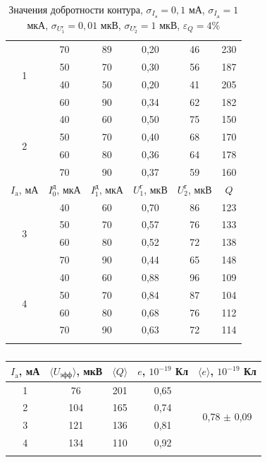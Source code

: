 \documentclass[a4paper, 12pt]{article}%
\begin{document}
\begin{enumerate}
\begin{longtable} {|c|c|c|c|c|c|}
		\multirow{4}{*}{1} & 70 & 89 & 0,20 & 46 & 230 \\ \cline{2-6}
		  & 50 & 70 & 0,30 & 56 & 187 \\ \cline{2-6}
		  & 40 & 50 & 0,20 & 41 & 205 \\ \cline{2-6}
		  & 60 & 90 & 0,34 & 62 & 182 \\ \hline
		  \hline
		\multirow{4}{*}{2} & 40 & 60 & 0,50 & 75 & 150 \\ \cline{2-6}
		& 50 & 70 & 0,40 & 68 & 170 \\ \cline{2-6}
		& 60 & 80 & 0,36 & 64 & 178 \\ \cline{2-6}
		& 70 & 90 & 0,37 & 59 & 160 \\ \hline
		
		\hline
		$I_{\text{a}}$, мА& $I^{\text{д}}_0$, мкА & $I^{\text{д}}_1$, мкА & $ U^{\text{г}}_1 $, мкВ  &$ U^{\text{г}}_2 $, мкВ  & $Q$\\ \hline
		
		\multirow{4}{*}{3} & 40 & 60 & 0,70 & 86 & 123 \\ \cline{2-6}
		& 50 & 70 & 0,57 & 76 & 133 \\ \cline{2-6}
		& 60 & 80 & 0,52 & 72 & 138 \\ \cline{2-6}
		& 70 & 90 & 0,44 & 65 & 148 \\ \hline
		\hline
		\multirow{4}{*}{4} & 40 & 60 & 0,88 & 96 & 109 \\ \cline{2-6}
		& 50 & 70 & 0,84 & 87 & 104 \\ \cline{2-6}
		& 60 & 80 & 0,68 & 76 & 112 \\ \cline{2-6}
		& 70 & 90 & 0,63 & 72 & 114 \\ \hline
		
		\caption{Значения добротности контура, $\sigma_{I_{\text{а}}} = 0,1$ мА, $\sigma_{I_{\text{д}}} = 1$ мкА, $\sigma_{U^{\text{г}}_1} = 0,01$ мкВ, $\sigma_{U^{\text{г}}_2} = 1$ мкВ, $\varepsilon_Q = 4\%$}
	\end{longtable}
	
	
	\begin{longtable} {|c|c|c|c|c|}
		\hline
		$I_{\text{a}}$, мА& $\langle U_{\text{эфф}} \rangle$, мкВ & $\langle Q \rangle$ & $e$, $10^{-19}$ Кл & $\langle e \rangle$, $10^{-19}$ Кл \\ \hline
		
		1 & 76 & 201 & 0,65 & \multirow{4}{*}{0,78 $\pm$ 0,09} \\ \cline{1-4}
		2 & 104 & 165 & 0,74 &  \\ \cline{1-4}
		3 & 121 & 136 & 0,81 &  \\ \cline{1-4}
		4 & 134 & 110 & 0,92 &  \\ \hline
		\caption{}
	\end{longtable}
	
	
	
	
	
	
	
	
	
	
	
	
	
	
	
	
	
	\end{enumerate}
	
	
	
	
\end{document}
